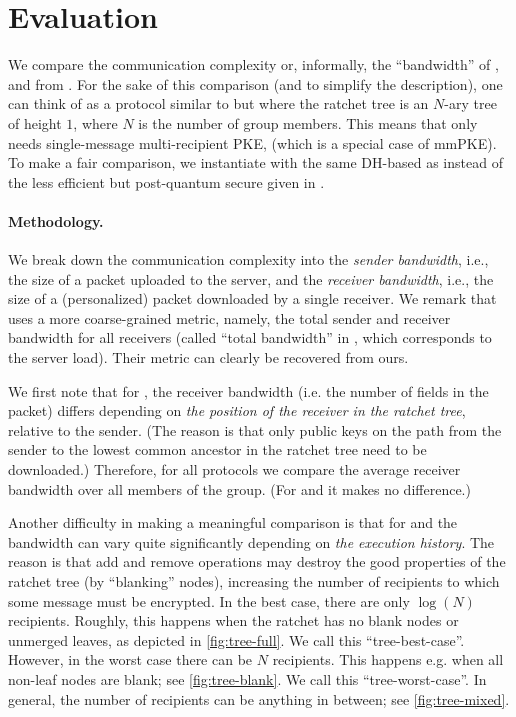 
\section{Evaluation}\label{sec:eval}
We compare the communication complexity or, informally, the ``bandwidth'' of \saik, \protITK and \protCMPKE from \cite{hashimoto2021cmpke}. For the sake of this comparison (and to simplify the description), one
can think of \protCMPKE as a protocol similar to \saik but where the ratchet tree is an $N$-ary tree of height $1$, where $N$ is the number of group members.
This means that \protCMPKE only needs single-message multi-recipient PKE, \mPKE (which is a special case of mmPKE).
To make a fair comparison, we instantiate \protCMPKE with the same DH-based \mPKE as \saik
instead of the less efficient but post-quantum secure \mPKE
given in \cite{hashimoto2021cmpke}.


\paragraph{Methodology.}
We break down the communication complexity into the \emph{sender bandwidth}, i.e., the size of a packet uploaded to the server, and the \emph{receiver bandwidth}, i.e., the size of a (personalized) packet downloaded by a single receiver.
We remark that \cite{hashimoto2021cmpke} uses a more coarse-grained metric, namely, the total sender and receiver
bandwidth for all receivers (called ``total bandwidth'' in \cite{hashimoto2021cmpke}, which corresponds to the server
load). Their metric can clearly be recovered from ours.

We first note that for \saik, the receiver bandwidth (i.e. the number of fields in the packet) differs depending on \emph{the position of the receiver in the ratchet tree}, relative to the sender. (The reason is that only public keys on the path from the sender to the lowest common ancestor in the ratchet tree need to be downloaded.) Therefore, for all protocols we compare the average receiver bandwidth over all members of the group. (For \protITK and \protCMPKE it makes no difference.)

Another difficulty in making a meaningful comparison is that for \saik and \protITK the bandwidth can vary quite
significantly depending on \emph{the execution history}. The reason is that add and remove operations may destroy the
good properties of the ratchet tree (by ``blanking'' nodes), increasing the number of recipients to which some message must be encrypted. In the
best case, there are only $\log(N)$ recipients. Roughly, this happens when the ratchet has no blank nodes or unmerged
leaves, as depicted in \cref{fig:tree-full}. We call this ``tree-best-case''. However, in the worst case there can be
$N$ recipients. This happens e.g. when all non-leaf nodes are blank; see \cref{fig:tree-blank}. We call this
``tree-worst-case''. In general, the number of recipients can be anything in between; see \cref{fig:tree-mixed}.

